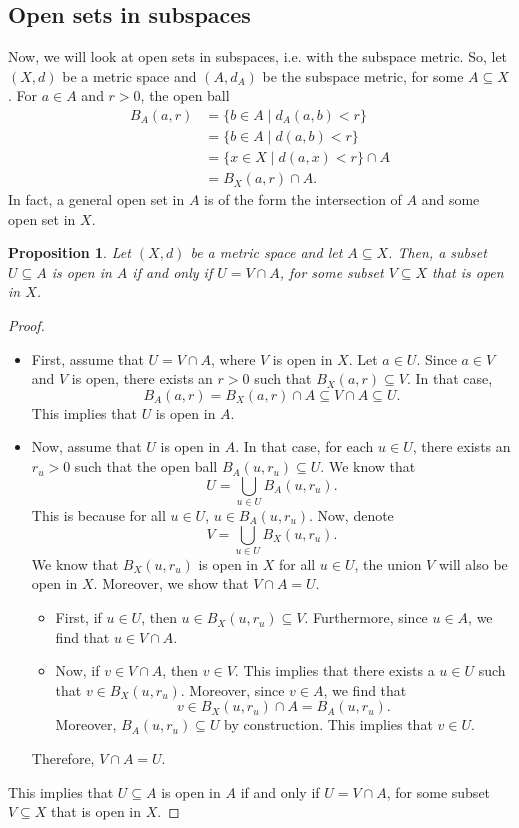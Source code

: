 \documentclass[a4paper, openany]{memoir}
\theoremstyle{definition}
\theoremstyle{plain}
\newtheorem{proposition}[definition]{Proposition}
\begin{document}
\subsection{Open sets in subspaces}
Now, we will look at open sets in subspaces, i.e. with the subspace metric. So, let $(X, d)$ be a metric space and $(A, d_A)$ be the subspace metric, for some $A \subseteq X$. For $a \in A$ and $r > 0$, the open ball
\begin{align*}
    B_A(a, r) &= \{b \in A \mid d_A(a, b) < r\} \\
    &= \{b \in A \mid d(a, b) < r\} \\
    &= \{x \in X \mid d(a, x) < r\} \cap A \\
    &= B_X(a, r) \cap A.
\end{align*}
In fact, a general open set in $A$ is of the form the intersection of $A$ and some open set in $X$.
\begin{proposition}
Let $(X, d)$ be a metric space and let $A \subseteq X$. Then, a subset $U \subseteq A$ is open in $A$ if and only if $U = V \cap A$, for some subset $V \subseteq X$ that is open in $X$.
\end{proposition}
\begin{proof}
\hspace*{0pt}
\begin{itemize}
    \item First, assume that $U = V \cap A$, where $V$ is open in $X$. Let $a \in U$. Since $a \in V$ and $V$ is open, there exists an $r > 0$ such that $B_X(a, r) \subseteq V$. In that case,
    \[B_A(a, r) = B_X(a, r) \cap A \subseteq V \cap A \subseteq U.\]
    This implies that $U$ is open in $A$.
    
    \item Now, assume that $U$ is open in $A$. In that case, for each $u \in U$, there exists an $r_u > 0$ such that the open ball $B_A(u, r_u) \subseteq U$. We know that
    \[U = \bigcup_{u \in U} B_A(u, r_u).\]
    This is because for all $u \in U$, $u \in B_A(u, r_u)$. Now, denote
    \[V = \bigcup_{u \in U} B_X(u, r_u).\]
    We know that $B_X(u, r_u)$ is open in $X$ for all $u \in U$, the union $V$ will also be open in $X$. Moreover, we show that $V \cap A = U$.
    \begin{itemize}
        \item First, if $u \in U$, then $u \in B_X(u, r_u) \subseteq V$. Furthermore, since $u \in A$, we find that $u \in V \cap A$.
        
        \item Now, if $v \in V \cap A$, then $v \in V$. This implies that there exists a $u \in U$ such that $v \in B_X(u, r_u)$. Moreover, since $v \in A$, we find that
        \[v \in B_X(u, r_u) \cap A = B_A(u, r_u).\]
        Moreover, $B_A(u, r_u) \subseteq U$ by construction. This implies that $v \in U$.
    \end{itemize}
    Therefore, $V \cap A = U$.
\end{itemize}
This implies that $U \subseteq A$ is open in $A$ if and only if $U = V \cap A$, for some subset $V \subseteq X$ that is open in $X$.
\end{proof}
\end{document}
